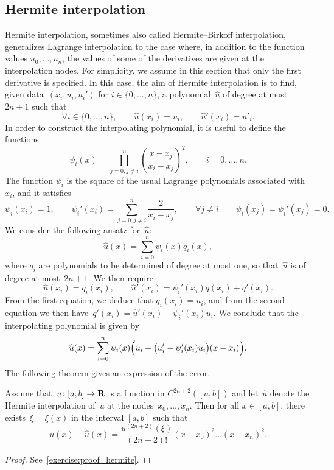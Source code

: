 \subsection{Hermite interpolation}
Hermite interpolation,
sometimes also called Hermite--Birkoff interpolation,
generalizes Lagrange interpolation to the case where,
in addition to the function values $u_0, \dotsc, u_n$,
the values of some of the derivatives are given at the interpolation nodes.
For simplicity,
we assume in this section that only the first derivative is specified.
In this case, the aim of Hermite interpolation is to find,
given data~$(x_i, u_i, u_i')$ for $i \in \{0, \dotsc, n\}$,
a polynomial~$\widehat u$ of degree at most~$2n + 1$ such that
\[
    \forall i \in \{0, \dotsc, n\}, \qquad
    \widehat u(x_i) = u_i, \qquad
    \widehat u'(x_i) = u'_i.
\]
In order to construct the interpolating polynomial,
it is useful to define the functions
\[
    \psi_{i}(x)
    = \prod_{j=0, j\neq i}^{n} \left( \frac{x-x_j}{x_i-x_j} \right)^2,
    \qquad i = 0, \dotsc, n.
\]
The function $\psi_i$ is the square of the usual Lagrange polynomials associated with~$x_i$,
and it satisfies
\[
    \psi_i(x_i) = 1,
    \qquad \psi_i'(x_i) = \sum_{j=0,j\neq i}^{n} \frac{2}{x_i - x_j},
    \qquad \forall j \neq i \qquad \psi_i(x_j) = \psi_i'(x_j) = 0.
\]
We consider the following ansatz for~$\widehat u$:
\[
    \widehat u(x) = \sum_{i=0}^{n} \psi_i(x) q_i(x),
\]
where $q_i$ are polynomials to be determined of degree at most one,
so that~$\widehat u$ is of degree at most~$2n+1$.
We then require
\[
    \widehat u(x_i) = q_i(x_i), \qquad \widehat u'(x_i) = \psi_i'(x_i) q(x_i) + q'(x_i).
\]
From the first equation, we deduce that $q_i(x_i) = u_i$,
and from the second equation we then have~$q'(x_i) = \widehat u'(x_i) - \psi_i'(x_i) u_i$.
We conclude that the interpolating polynomial is given by
\[
    \widehat u(x) = \sum_{i=0}^{n} \psi_i(x) \Bigl(u_i + \bigl(u_i' - \psi_i'(x_i) u_i\bigr) (x - x_i)\Bigr).
\]
The following theorem gives an expression of the error.
\begin{theorem}
    \label{theorem:hermite_interpolation}
    Assume that~$u\colon [a, b] \to \mathbf R$ is a function in $C^{2n+2}([a, b])$ and let~$\widehat u$
    denote the Hermite interpolation of~$u$ at the nodes~$x_0, \dotsc, x_n$.
    Then for all $x \in [a, b]$,
    there exists~$\xi = \xi(x)$ in the interval $[a, b]$ such that
    \[
        u(x) - \widehat u(x) = \frac{u^{(2n+2)}(\xi)}{(2n+2)!} (x-x_0)^2 \dotsc (x - x_n)^2.
    \]
\end{theorem}
\begin{proof}
    See~\cref{exercise:proof_hermite}.
\end{proof}

